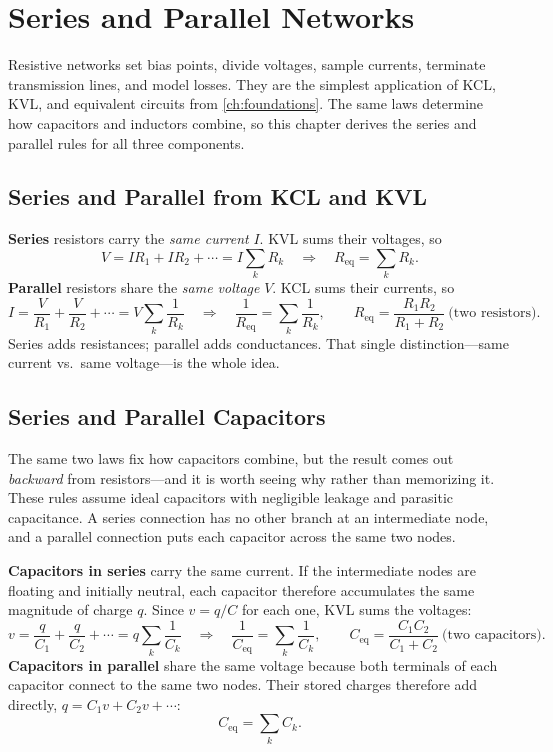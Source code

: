 \chapter{Series and Parallel Networks}
\label{ch:resistive}
Resistive networks set bias points, divide voltages, sample currents, terminate
transmission lines, and model losses. They are the simplest application of KCL,
KVL, and equivalent circuits from \cref{ch:foundations}. The same laws determine
how capacitors and inductors combine, so this chapter derives the series and
parallel rules for all three components.

\section{Series and Parallel from KCL and KVL}
\textbf{Series} resistors carry the \emph{same current} \(I\). KVL sums their
voltages, so
\[
V=IR_1+IR_2+\cdots=I\sum_k R_k
\quad\Longrightarrow\quad
R_{\mathrm{eq}}=\sum_k R_k .
\]
\textbf{Parallel} resistors share the \emph{same voltage} \(V\). KCL sums their
currents, so
\[
I=\frac{V}{R_1}+\frac{V}{R_2}+\cdots=V\sum_k\frac{1}{R_k}
\quad\Longrightarrow\quad
\frac{1}{R_{\mathrm{eq}}}=\sum_k\frac{1}{R_k},
\qquad
R_{\mathrm{eq}}=\frac{R_1R_2}{R_1+R_2}\ \text{(two resistors)}.
\]
Series adds resistances; parallel adds conductances. That single distinction---same
current vs.\ same voltage---is the whole idea.

\section{Series and Parallel Capacitors}
The same two laws fix how capacitors combine, but the result comes out
\emph{backward} from resistors---and it is worth seeing why rather than
memorizing it. These rules assume ideal capacitors with negligible leakage and
parasitic capacitance. A series connection has no other branch at an intermediate
node, and a parallel connection puts each capacitor across the same two nodes.

\textbf{Capacitors in series} carry the same current. If the intermediate nodes
are floating and initially neutral, each capacitor therefore accumulates the same
magnitude of charge \(q\). Since \(v=q/C\) for each one, KVL sums the voltages:
\[
v=\frac{q}{C_1}+\frac{q}{C_2}+\cdots=q\sum_k\frac{1}{C_k}
\quad\Longrightarrow\quad
\frac{1}{C_{\mathrm{eq}}}=\sum_k\frac{1}{C_k},
\qquad
C_{\mathrm{eq}}=\frac{C_1C_2}{C_1+C_2}\ \text{(two capacitors)}.
\]
\textbf{Capacitors in parallel} share the same voltage because both terminals of
each capacitor connect to the same two nodes. Their stored charges therefore add
directly, \(q=C_1v+C_2v+\cdots\):
\[
C_{\mathrm{eq}}=\sum_k C_k .
\]

